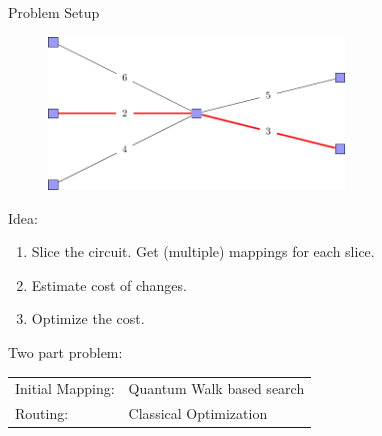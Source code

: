 \documentclass{beamer}
\begin{document}
\begin{frame}{Problem Setup}
\begin{minipage}{0.5\textwidth}
\begin{figure}
\begin{overprint}
		\centering
		\includegraphics[width=0.7\textwidth]{figures/many_mappings_optimum}
		\end{overprint}
     \hfill %
\end{figure}
\end{minipage}%
%
\begin{minipage}{0.5\textwidth}
\pause
Idea:
\begin{enumerate}
	\item Slice the circuit. \pause Get (multiple) mappings for each slice. \pause
	\item Estimate cost of changes. \pause
	\item Optimize the cost. \pause
\end{enumerate}
\end{minipage}%

Two part problem:\\
\begin{table}[]
\begin{tabular}{ll}
Initial Mapping: & Quantum Walk based search \pause \\
Routing:         & Classical Optimization   
\end{tabular}
\end{table}
\end{frame}
\end{document}
